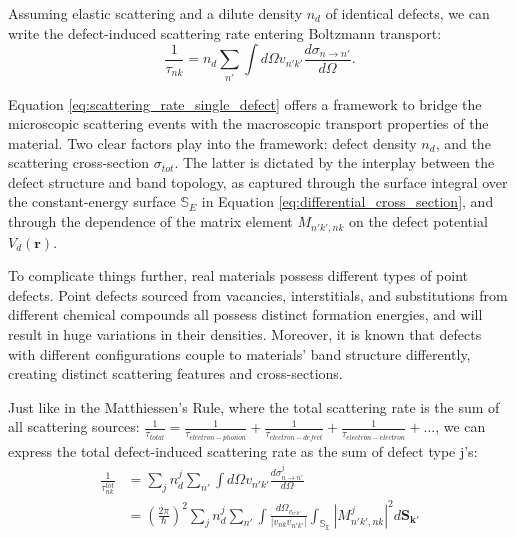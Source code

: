Assuming elastic scattering and a dilute density $n_d$ of identical defects, we can write the defect-induced scattering rate entering Boltzmann transport: 
\begin{equation}
	\label{eq:scattering_rate_single_defect}
	\frac{1}{\tau_{nk}} = n_d \sum_{n'}\int d\Omega v_{n'k'} \frac{d\sigma_{n\rightarrow n'}}{d\Omega}. 
\end{equation}

Equation \ref{eq:scattering_rate_single_defect} offers a framework to bridge the microscopic scattering events with the macroscopic transport properties of the material. Two clear factors play into the framework: defect density $n_d$, and the scattering cross-section $\sigma_{tot}$. The latter is dictated by the interplay between the defect structure and band topology, as captured through the surface integral over the constant-energy surface $\mathbb{S}_E$ in Equation \ref{eq:differential_cross_section}, and through the dependence of the matrix element $M_{n'k',nk}$ on the defect potential $V_d(\mathbf{r})$.

To complicate things further, real materials possess different types of point defects\cite{stuartScanningTunnellingMicroscopy2021}\cite{bertoldoQuantumPointDefects2022}. Point defects sourced from vacancies, interstitials, and substitutions from different chemical compounds all possess distinct formation energies\cite{bertoldoQuantumPointDefects2022}\cite{lopesDefectFormationEnergy2023}, and will result in huge variations in their densities. Moreover, it is known that defects with different configurations couple to materials' band structure differently, creating distinct scattering features and cross-sections\cite{butlerQuasiparticleInterferenceZrSiS2017}\cite{chiSignInversionSuperconducting2014}\cite{derryQuasiparticleInterferenceMagnetic2015a}. 

Just like in the Matthiessen’s Rule, where the total scattering rate is the sum of all scattering sources: $\frac{1}{\tau_{total}} = \frac{1}{\tau_{electron-phonon}} + \frac{1}{\tau_{electron-defect}} + \frac{1}{\tau_{electron-electron}}+...$, we can express the total defect-induced scattering rate as the sum of defect type j's: 
\begin{align}
	\label{eq:scattering_rate_multi_defect1}
	\frac{1}{\tau_{nk}^{tot}} &= \sum_j n_d^j \sum_{n'}\int d\Omega v_{n'k'} \frac{d\sigma^j_{n\rightarrow n'}}{d\Omega}\\
	&= (\frac{2\pi}{\hslash})^2 \sum_j n_d^j \sum_{n'} \int \frac{d\Omega_{v_{n'k'}}}{|v_{nk}v_{n'k'}|}\int_{\mathbb{S_E}}|M_{n'k',nk}^j|^2 d\mathbf{S_{k'}}\label{eq:scattering_rate_multi_defect2}
\end{align}

